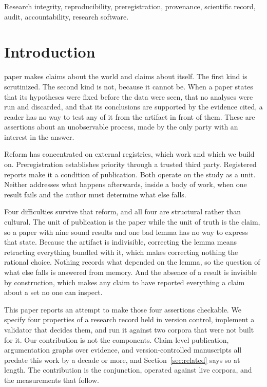 \documentclass[journal]{IEEEtran}
\begin{document}
\begin{IEEEkeywords}
Research integrity, reproducibility, preregistration, provenance, scientific
record, audit, accountability, research software.
\end{IEEEkeywords}

\section{Introduction}

 paper makes claims about the world and claims about
itself. The first kind is scrutinized. The second kind is not, because it cannot
be. When a paper states that its hypotheses were fixed before the data were seen,
that no analyses were run and discarded, and that its conclusions are supported by
the evidence cited, a reader has no way to test any of it from the artifact in
front of them. These are assertions about an unobservable process, made by the
only party with an interest in the answer.

Reform has concentrated on external registries, which work and which we build
on. Preregistration establishes priority through a trusted third party.
Registered reports make it a condition of publication. Both operate on the study
as a unit. Neither addresses what happens afterwards, inside a body of work, when
one result fails and the author must determine what else falls.

Four difficulties survive that reform, and all four are structural rather than
cultural. The unit of publication is the paper while the unit of truth is the
claim, so a paper with nine sound results and one bad lemma has no way to
express that state. Because the artifact is indivisible, correcting the lemma
means retracting everything bundled with it, which makes correcting nothing the
rational choice. Nothing records what depended on the lemma, so the question of
what else falls is answered from memory. And the absence of a result is invisible
by construction, which makes any claim to have reported everything a claim about
a set no one can inspect.

This paper reports an attempt to make those four assertions checkable. We
specify four properties of a research record held in version control, implement a
validator that decides them, and run it against two corpora that were not built
for it. Our contribution is not the components. Claim-level publication,
argumentation graphs over evidence, and version-controlled manuscripts all
predate this work by a decade or more, and Section~\ref{sec:related} says so at
length. The contribution is the conjunction, operated against live corpora, and
the measurements that follow.
\end{document}
